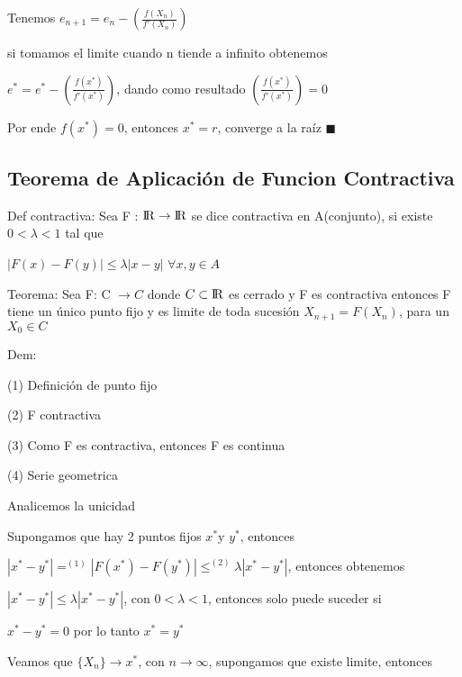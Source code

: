 \documentclass{article}
\begin{document}
Tenemos $e_{n+1} = e_n - \left( \displaystyle\frac{f(X_n)}{f'(X_n)} \right) $

si tomamos el limite cuando n tiende a infinito obtenemos

$e^* = e^*- \left( \displaystyle\frac{f(x^*)}{f'(x^*)} \right) $, dando como resultado $  \left( \displaystyle\frac{f(x^*)}{f'(x^*)} \right) = 0$

Por ende $f(x^*) = 0$, entonces $x^* = r$, converge a la raíz $\blacksquare$

\vspace{10mm}

\subsection{Teorema de Aplicación de Funcion Contractiva}\label{Teorema-de-Funcion-Contractiva}

Def contractiva: Sea F : ${\rm I\!R} \rightarrow {\rm I\!R}$ se dice contractiva en A(conjunto), si existe $0<\lambda<1$ tal que

$|F(x)-F(y)| \leq \lambda |x-y|$ $\forall x,y \in A$

\vspace{5mm}

Teorema: Sea F: C $\rightarrow C$  donde $C \subset {\rm I\!R}$ es cerrado y F es contractiva entonces F tiene un único punto fijo y es limite de toda sucesión
$X_{n+1} = F(X_n)$, para un $X_0 \in C$  

\vspace{5mm}

Dem:

(1) Definición de punto fijo

(2) F contractiva

(3) Como F es contractiva, entonces F es continua

(4) Serie geometrica

Analicemos la unicidad

Supongamos que hay 2 puntos fijos $x^*$y $y^*$, entonces

$|x^*-y^*| =^{(1)} |F(x^*)-F(y^*)| \leq^{(2)} \lambda|x^*-y^*| $, entonces obtenemos

$|x^*-y^*|  \leq \lambda|x^*-y^*| $, con $0<\lambda<1$, entonces solo puede suceder si

$x^*-y^* = 0$ por lo tanto $x^*=y^*$

\vspace{5mm}

Veamos que $\{ X_n \} \rightarrow x^*$, con $ n \rightarrow \infty $, supongamos que existe limite, entonces
\end{document}
